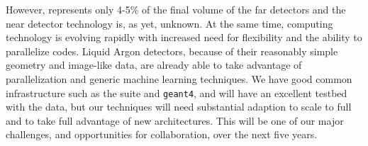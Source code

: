 However,  represents only 4-5\% of the final volume of the far detectors and the near detector technology is, as yet, unknown.  At the same time, computing technology is evolving rapidly with increased need for flexibility and the ability to parallelize codes.  Liquid Argon detectors, because of their reasonably simple geometry and image-like data, are already able to take advantage of parallelization and generic machine learning techniques.  We have good common infrastructure such as the  suite and {\tt geant4}, and will have an excellent testbed with the  data,  but our techniques will need substantial adaption to scale to full  and to take full advantage of new architectures.  This will be one of our major challenges, and opportunities for collaboration,  over the next five years.

